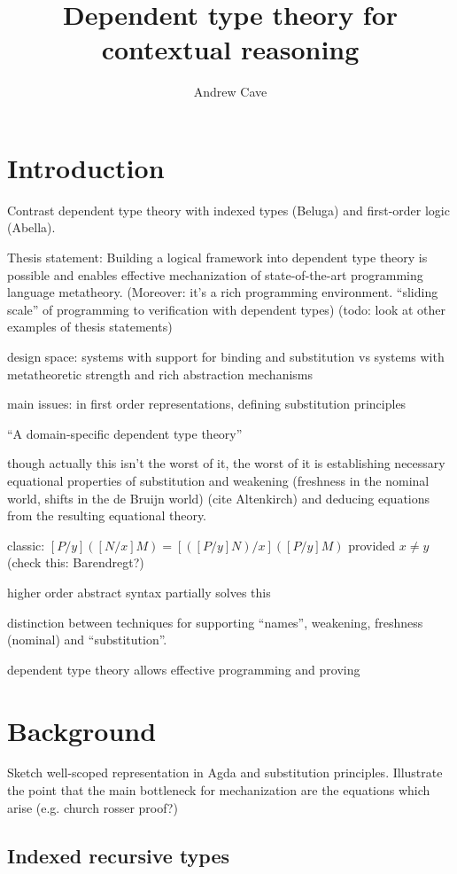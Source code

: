 \documentclass{article}
\author{Andrew Cave}
\title{Dependent type theory for contextual reasoning}
\begin{document}
\maketitle

\section{Introduction}
Contrast dependent type theory with indexed types (Beluga) and first-order
logic (Abella).

Thesis statement: Building a logical framework into dependent type
theory is possible and enables effective mechanization of state-of-the-art programming
language metatheory. (Moreover: it's a rich programming
environment. ``sliding scale'' of programming to verification with dependent types)
(todo: look at other examples of thesis statements)

design space: systems with support for binding and substitution vs
systems with metatheoretic strength and rich abstraction mechanisms

main issues:
in first order representations, defining substitution principles

``A domain-specific dependent type theory''

though actually this isn't the worst of it, the worst of it is
establishing necessary equational properties of substitution and weakening
(freshness in the nominal world, shifts in the de Bruijn world) (cite
Altenkirch) and deducing equations from the resulting equational
theory.

classic: $[P/y]([N/x]M) = [([P/y]N)/x] ([P/y]M)$ provided $x\neq y$
(check this: Barendregt?)

higher order abstract syntax partially solves this

distinction between techniques for supporting ``names'', weakening, freshness (nominal) and ``substitution''.

dependent type theory allows effective programming and proving
\section{Background}
Sketch well-scoped representation in Agda and substitution
principles. Illustrate the point that the main bottleneck for
mechanization are the equations which arise (e.g. church rosser proof?)

\subsection{Indexed recursive types}
\end{document}
